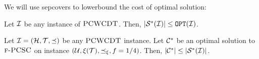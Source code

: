 We will use sepcovers to lowerbound the cost of optimal solution:
\begin{observation} \label{ea:obs:sepcoverWC}
    Let $\cI$ be any instance of $\ProblemPCWCDT$.
    Then, $\spr{\sepcover{\cI}} \leq \OPT\br{\cI}$.
\end{observation}

\begin{lemma}\label{ea:lemma:cover_sep_worst_case}
    Let $\cI=\br{\cH, \cT, \preceq}$ be any $\ProblemPCWCDT$ instance.
    Let $\cC^*$ be an optimal solution to $\ProblemPCSC$ on instance $\br{\cU, \xi(\cT), \preceq_{\xi}, f=1/4}$.
    Then, $\spr{\cC^*} \leq \spr{\sepcover{\cI}}$.
\end{lemma}


